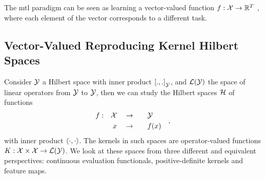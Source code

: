 

The \acrshort{mtl} paradigm can be seen as learning a vector-valued function
$f: \mathcal{X} \to \mathbb{R}^T$
, where each element of the vector corresponds to a different task. 


\subsection{Vector-Valued Reproducing Kernel Hilbert Spaces}%
Consider $\mathcal{Y}$ a Hilbert space with inner product $\left[ ., . \right]_\mathcal{Y}$, and $\mathcal{L}(\mathcal{Y})$ the space of linear operators from $\mathcal{Y}$ to $\mathcal{Y}$, then we can study the Hilbert spaces $\mathcal{H}$ of functions
\begin{equation*}
    \begin{aligned}
        f: &&\mathcal{X}&& &\to& &&&\mathcal{Y}&& \\
             && x&&      &\to& &&& f(x) &&
    \end{aligned},
\end{equation*}
with inner product $\left\langle \cdot, \cdot \right\rangle$.
The kernels in such spaces are operator-valued functions $K: \mathcal{X} \times \mathcal{X} \to \mathcal{L}(\mathcal{Y})$.
We look at these spaces from three different and equivalent perspectives: continuous evaluation functionals, positive-definite kernels and feature maps.

